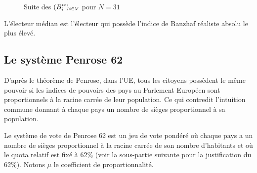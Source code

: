 \begin{figure}[H]
	\centering
	\caption{Suite des $(B_i'^r)_{i \in \mathcal{V}}$ pour $N = 31$}
\end{figure}

\begin{theoreme}
	L'électeur médian est l'électeur qui possède l'indice de Banzhaf réaliste absolu le plus élevé.
\end{theoreme}


\subsection{Le système Penrose 62}

D'après le théorème de Penrose, dans l’UE, tous les citoyens possèdent le même pouvoir si les indices de pouvoirs des pays au Parlement Européen sont proportionnels à la racine carrée de leur population.
Ce qui contredit l'intuition commune donnant à chaque pays un nombre de sièges proportionnel à sa population.

Le système de vote de Penrose 62 est un jeu de vote pondéré où chaque pays a un nombre de sièges proportionnel à la racine carrée de son nombre d'habitants et où le quota relatif est fixé à 62\% (voir la sous-partie suivante pour la justification du 62\%). Notons $\mu$ le coefficient de proportionnalité.

